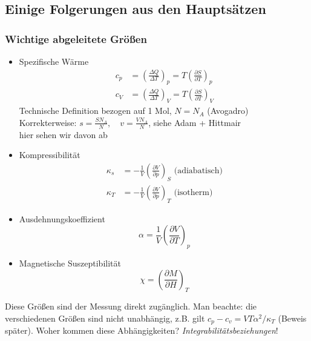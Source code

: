 \subsection{Einige Folgerungen aus den Hauptsätzen}
\subsubsection{Wichtige abgeleitete Größen}
\begin{itemize}
    \item Spezifische Wärme
    \begin{equation}
        \begin{split}
            c_p &= \left( \frac{\Delta Q}{\Delta T} \right)_p = T \left( \frac{\partial S}{\partial T} \right)_p \\
            c_V &= \left( \frac{\Delta Q}{\Delta T} \right)_V = T \left( \frac{\partial S}{\partial T} \right)_V
        \end{split}
    \end{equation}
    Technische Definition bezogen auf 1 Mol, $N=N_A$ (Avogadro) \\
    Korrekterweise: $s = \frac{S N_A}{N}, \quad v = \frac{V N_A}{N}$, siehe Adam + Hittmair \\
    hier sehen wir davon ab
    \item Kompressibilität
    \begin{equation}
        \begin{split}
            \kappa_s &= - \frac{1}{V} \left( \frac{\partial V}{\partial p} \right)_S \text{ (adiabatisch)} \\
            \kappa_T &= - \frac{1}{V} \left( \frac{\partial V}{\partial p} \right)_T \text{ (isotherm)}
        \end{split}
    \end{equation}
    \item Ausdehnungskoeffizient
    \begin{equation}
        \alpha = \frac{1}{V} \left( \frac{\partial V}{\partial T} \right)_p
    \end{equation}
    \item Magnetische Suszeptibilität
    \begin{equation}
        \chi = \left( \frac{\partial M}{\partial H} \right)_T
    \end{equation}
\end{itemize}
Diese Größen sind der Messung direkt zugänglich. Man beachte: die verschiedenen Größen sind nicht unabhängig, z.B. gilt
$c_p - c_v = V T \alpha^2 / \kappa_T$ (Beweis später).
Woher kommen diese Abhängigkeiten? \emph{Integrabilitätsbeziehungen}!
